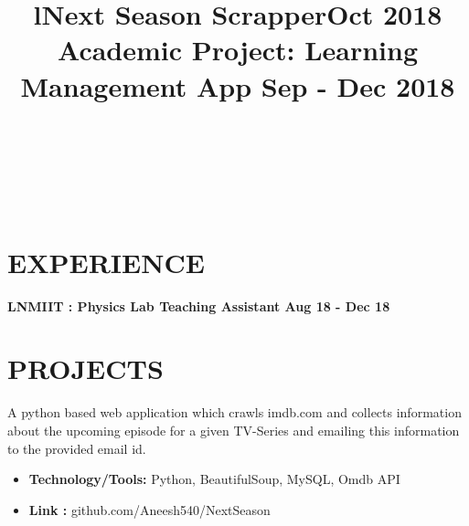 \documentclass[margin]{res}
\begin{document}
\begin{resume}
\begin{format}
\title{l}\\
\\
\body\\
\end{format}

\section{EXPERIENCE}

\textbf{LNMIIT : Physics Lab Teaching Assistant \hfill{Aug 18 - Dec 18}\\}

\section{PROJECTS}
\location{}
\title{\textbf{Next Season Scrapper\hfill Oct 2018}
 }

A python based web application which crawls imdb.com and collects information about the upcoming episode for a given TV-Series and emailing this information to the provided email id.  
\begin{itemize}
\item \textbf{Technology/Tools:} Python, BeautifulSoup, MySQL, Omdb API
\end{itemize}
\begin{itemize}
\item \textbf{Link :} github.com/Aneesh540/NextSeason
\end{itemize}


\location{}
\title{\textbf{Academic Project: Learning Management App \hfill Sep - Dec 2018}
 }
 


\end{resume}
\end{document}

